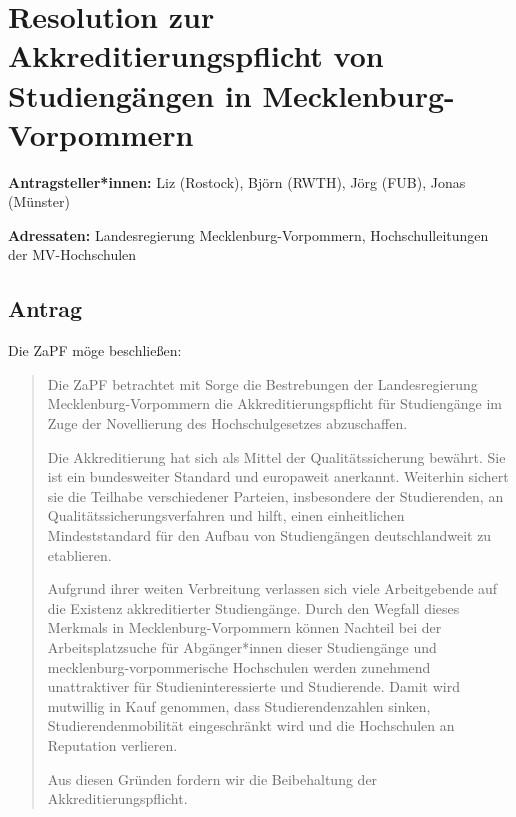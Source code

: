 \documentclass[draft,10pt,oneside]{scrartcl}
\begin{document}
\section*{Resolution zur Akkreditierungspflicht von Studiengängen in Mecklenburg-Vorpommern}

\textbf{Antragsteller*innen:} Liz (Rostock), Björn (RWTH), Jörg (FUB), Jonas (Münster)

\textbf{Adressaten:} Landesregierung Mecklenburg-Vorpommern, Hochschulleitungen der MV-Hochschulen

\subsection*{Antrag}

Die ZaPF möge beschließen:

\begin{quote}
    Die ZaPF betrachtet mit Sorge die Bestrebungen der Landesregierung
    Mecklenburg-Vorpommern die Akkreditierungspflicht für Studiengänge im Zuge
    der Novellierung des Hochschulgesetzes abzuschaffen.

    Die Akkreditierung hat sich als Mittel der Qualitätssicherung bewährt. Sie
    ist ein bundesweiter Standard und europaweit anerkannt. Weiterhin sichert
    sie die Teilhabe verschiedener Parteien, insbesondere der Studierenden, an
    Qualitätssicherungsverfahren und hilft, einen einheitlichen Mindeststandard
    für den Aufbau von Studiengängen deutschlandweit zu etablieren.

    Aufgrund ihrer weiten Verbreitung verlassen sich viele Arbeitgebende auf die
    Existenz akkreditierter Studiengänge. Durch den Wegfall dieses Merkmals in
    Mecklenburg-Vorpommern können Nachteil bei der Arbeitsplatzsuche für
    Abgänger*innen dieser Studiengänge und mecklenburg-vorpommerische
    Hochschulen werden zunehmend unattraktiver für Studieninteressierte und
    Studierende.
    Damit wird mutwillig in Kauf genommen, dass Studierendenzahlen sinken,
    Studierendenmobilität eingeschränkt wird und die Hochschulen an Reputation
    verlieren.

    Aus diesen Gründen fordern wir die Beibehaltung der Akkreditierungspflicht.
\end{quote}
\end{document}
